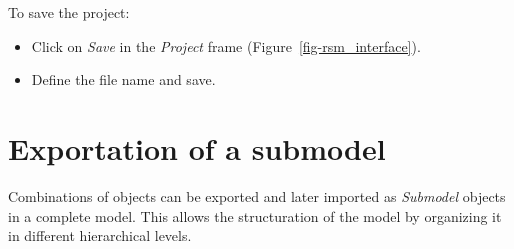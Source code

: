 \documentclass[
  letterpaper,
  DIV=11,
  numbers=noendperiod]{scrreprt}
\begin{document}
To save the project:

\begin{itemize}
\item
  {Click on \emph{Save} in the \emph{Project} frame
  (Figure~\ref{fig-rsm_interface}).}
\item
  {Define the file name and save.}
\end{itemize}

\hypertarget{sec-user_rainfall_runoff_export_submodel}{%
\chapter{Exportation of a
submodel}\label{sec-user_rainfall_runoff_export_submodel}}

Combinations of objects can be exported and later imported as
\emph{Submodel} objects in a complete model. This allows the
structuration of the model by organizing it in different hierarchical
levels.
\end{document}
